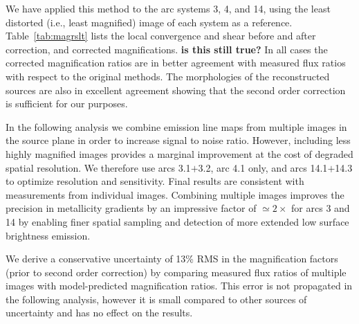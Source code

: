 We have applied this method to the arc systems 3, 4, and 14, using the least distorted (i.e., least magnified)
image of each system as a reference. Table~\ref{tab:magrslt} lists the local convergence and shear before and
after correction, and corrected magnifications. {\bf is this still true?} In all cases the corrected
magnification ratios are in better agreement with measured flux ratios with respect to the original methods. The
morphologies of the reconstructed sources are also in excellent agreement showing that the second order
correction is sufficient for our purposes.

In the following analysis we combine emission line maps from multiple images in the source plane in order to
increase signal to noise ratio. However, including less highly magnified images provides a marginal improvement
at the cost of degraded spatial resolution. We therefore use arcs 3.1$+$3.2, arc 4.1 only, and arcs 14.1$+$14.3
to optimize resolution and sensitivity. Final results are consistent with measurements from individual images.
Combining multiple images improves the precision in metallicity gradients by an impressive factor of
$\simeq2\times$ for arcs 3 and 14 by enabling finer spatial sampling and detection of more extended low surface
brightness emission.

We derive a conservative uncertainty of 13\% RMS in the magnification factors (prior to second order correction)
by comparing measured flux ratios of multiple images with model-predicted magnification ratios. This error is not
propagated in the following analysis, however it is small compared to other sources of uncertainty and has no
effect on the results.

